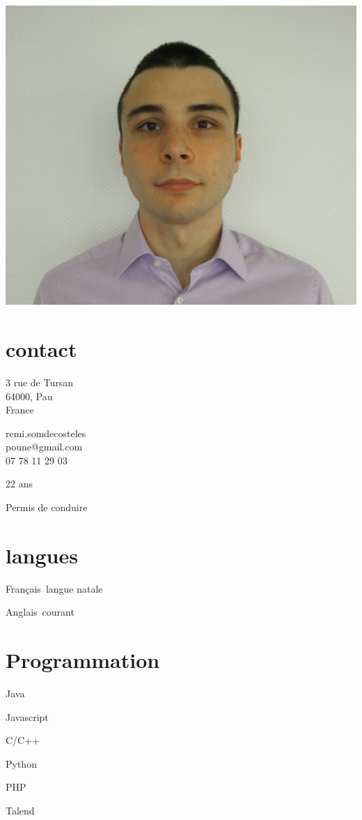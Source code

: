 \begin{aside}
%
\includegraphics[width=1\textwidth]{photo.jpg}
\section{contact}
    \item{
        3 rue de Tursan\\
        64000, Pau\\
        France
    }
    \item{
        remi.somdecosteles\\poune@gmail.com\\
        07 78 11 29 03
    }
    \item 22 ans
    \item Permis de conduire

\section{langues}
    \item Français\cdotp~langue natale
    \item Anglais\cdotp~courant

\section{Programmation}
    \item Java
    \item Javascript
    \item C/C++
    \item Python
    \item PHP
    \item Talend
\end{aside}
